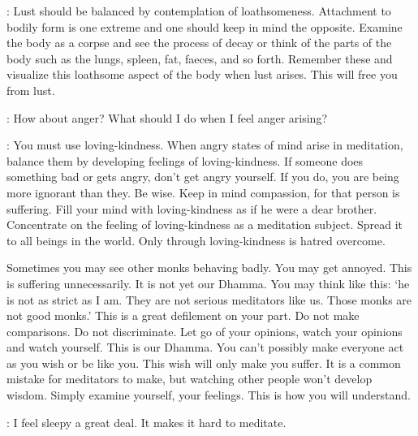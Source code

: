 : Lust should be balanced by contemplation of loathsomeness. Attachment to bodily form is one extreme and one should keep in mind the opposite. Examine the body as a corpse and see the process of decay or think of the parts of the body such as the lungs, spleen, fat, faeces, and so forth. Remember these and visualize this loathsome aspect of the body when lust arises. This will free you from lust. 

:
How about anger? What should I do when I feel anger arising? 


: You must use loving-kindness. When angry states of mind arise in meditation, balance them by developing feelings of loving-kindness. If someone does something bad or gets angry, don't get angry yourself. If you do, you are being more ignorant than they. Be wise. Keep in mind compassion, for that person is suffering. Fill your mind with loving-kindness as if he were a dear brother. Concentrate on the feeling of loving-kindness as a meditation subject. Spread it to all beings in the world. Only through loving-kindness is hatred overcome. 

Sometimes you may see other monks behaving badly. You may get annoyed. This is suffering unnecessarily. It is not yet our Dhamma. You may think like this: `he is not as strict as I am. They are not serious meditators like us. Those monks are not good monks.' This is a great defilement on your part. Do not make comparisons. Do not discriminate. Let go of your opinions, watch your opinions and watch yourself. This is our Dhamma. You can't possibly make everyone act as you wish or be like you. This wish will only make you suffer. It is a common mistake for meditators to make, but watching other people won't develop wisdom. Simply examine yourself, your feelings. This is how you will understand. 

:
I feel sleepy a great deal. It makes it hard to meditate. 

